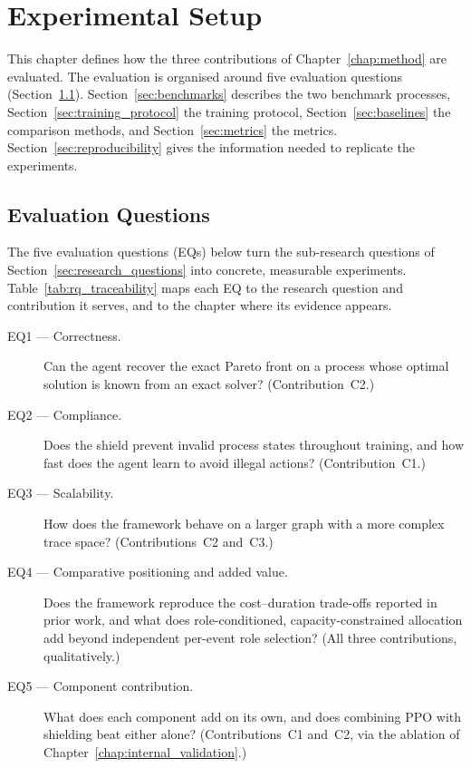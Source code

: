 
\chapter{Experimental Setup}
\label{chap:experimental_setup}

This chapter defines how the three contributions of
Chapter~\ref{chap:method} are evaluated. The evaluation is organised
around five evaluation questions (Section~\ref{sec:experimental_objectives}).
Section~\ref{sec:benchmarks} describes the two benchmark processes,
Section~\ref{sec:training_protocol} the training protocol,
Section~\ref{sec:baselines} the comparison methods, and
Section~\ref{sec:metrics} the metrics. Section~\ref{sec:reproducibility}
gives the information needed to replicate the experiments.

\section{Evaluation Questions}
\label{sec:experimental_objectives}

The five evaluation questions (EQs) below turn the sub-research
questions of Section~\ref{sec:research_questions} into concrete,
measurable experiments. Table~\ref{tab:rq_traceability} maps each EQ to
the research question and contribution it serves, and to the chapter
where its evidence appears.

\begin{description}
    \item[EQ1 --- Correctness.]
    Can the agent recover the exact Pareto front on a process whose
    optimal solution is known from an exact solver? (Contribution~C2.)

    \item[EQ2 --- Compliance.]
    Does the shield prevent invalid process states throughout
    training, and how fast does the agent learn to avoid illegal
    actions? (Contribution~C1.)

    \item[EQ3 --- Scalability.]
    How does the framework behave on a larger graph with a more complex
    trace space? (Contributions~C2 and~C3.)

    \item[EQ4 --- Comparative positioning and added value.]
    Does the framework reproduce the cost--duration trade-offs reported
    in prior work, and what does role-conditioned, capacity-constrained
    allocation add beyond independent per-event role selection?
    (All three contributions, qualitatively.)

    \item[EQ5 --- Component contribution.]
    What does each component add on its own, and does combining \ac{PPO}
    with shielding beat either alone? (Contributions~C1 and~C2, via the
    ablation of Chapter~\ref{chap:internal_validation}.)
\end{description}

